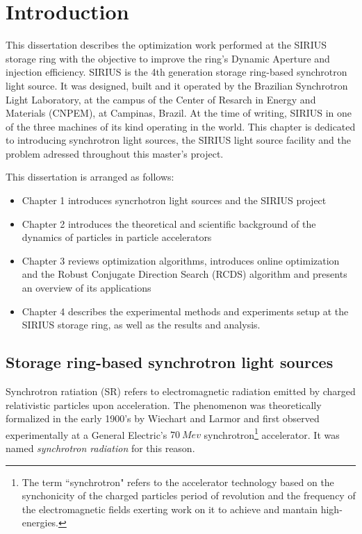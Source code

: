 \chapter{Introduction}
This dissertation describes the optimization work performed at the SIRIUS storage ring with the objective to improve the ring's Dynamic Aperture and injection efficiency.
SIRIUS is the 4th generation storage ring-based synchrotron light source. It was designed, built and it operated by the Brazilian Synchrotron Light Laboratory, at the campus of the Center of Resarch in Energy and Materials (CNPEM), at Campinas, Brazil. At the time of writing, SIRIUS in one of the three machines of its kind operating in the world. This chapter is dedicated to introducing synchrotron light sources, the SIRIUS light source facility and the problem adressed throughout this master's project.

This dissertation is arranged as follows:
\begin{itemize}
    \item Chapter 1 introduces syncrhotron light sources and the SIRIUS project
    \item Chapter 2 introduces the theoretical and scientific background of the dynamics of particles in particle accelerators
    \item Chapter 3 reviews optimization algorithms, introduces online optimization and the Robust Conjugate Direction Search (RCDS) algorithm and presents an overview of its applications
    \item Chapter 4 describes the experimental methods and experiments setup at the SIRIUS storage ring, as well as the results and analysis.
\end{itemize}

\section{Storage ring-based synchrotron light sources}

Synchrotron ratiation (SR) refers to electromagnetic radiation emitted by charged relativistic particles upon acceleration. The phenomenon was theoretically formalized in the early 1900's by Wiechart and Larmor and first observed experimentally at a General Electric's $70~\unit{Mev}$ synchrotron\footnote{The term ``synchrotron" refers to the accelerator  technology based on the synchonicity of the charged particles period of revolution and the frequency of the electromagnetic fields exerting work on it to achieve and mantain high-energies.} accelerator. It was named \textit{synchrotron radiation} for this reason.

